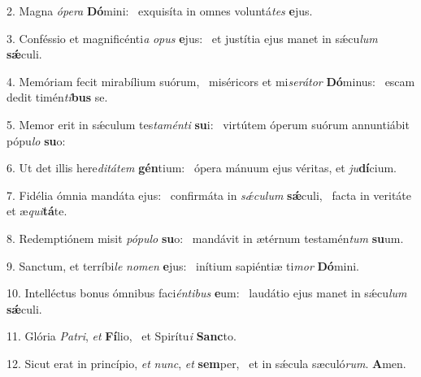 2. Magna \textit{ó}\textit{pe}\textit{ra} \textbf{Dó}mini: \ast\  exquisíta in omnes voluntá\textit{tes} \textbf{e}jus.\

3. Conféssio et magnificénti\textit{a} \textit{o}\textit{pus} \textbf{e}jus: \ast\  et justítia ejus manet in sǽcu\textit{lum} \textbf{sǽ}culi.\

4. Memóriam fecit mirabílium suórum, \dag\  miséricors et mi\textit{se}\textit{rá}\textit{tor} \textbf{Dó}minus: \ast\  escam dedit timén\textit{ti}\textbf{bus} se.\

5. Memor erit in sǽculum tes\textit{ta}\textit{mén}\textit{ti} \textbf{su}i: \ast\  virtútem óperum suórum annuntiábit pópu\textit{lo} \textbf{su}o:\

6. Ut det illis here\textit{di}\textit{tá}\textit{tem} \textbf{gén}tium: \ast\  ópera mánuum ejus véritas, et \textit{ju}\textbf{dí}cium.\

7. Fidélia ómnia mandáta ejus: \dag\  confirmáta in \textit{sǽ}\textit{cu}\textit{lum} \textbf{sǽ}culi, \ast\  facta in veritáte et æ\textit{qui}\textbf{tá}te.\

8. Redemptiónem misit \textit{pó}\textit{pu}\textit{lo} \textbf{su}o: \ast\  mandávit in ætérnum testamén\textit{tum} \textbf{su}um.\

9. Sanctum, et terríbi\textit{le} \textit{no}\textit{men} \textbf{e}jus: \ast\  inítium sapiéntiæ ti\textit{mor} \textbf{Dó}mini.\

10. Intelléctus bonus ómnibus faci\textit{én}\textit{ti}\textit{bus} \textbf{e}um: \ast\  laudátio ejus manet in sǽcu\textit{lum} \textbf{sǽ}culi.\

11. Glória \textit{Pa}\textit{tri}, \textit{et} \textbf{Fí}lio, \ast\  et Spirítu\textit{i} \textbf{Sanc}to.\

12. Sicut erat in princípio, \textit{et} \textit{nunc}, \textit{et} \textbf{sem}per, \ast\  et in sǽcula sæculó\textit{rum}. \textbf{A}men.\


